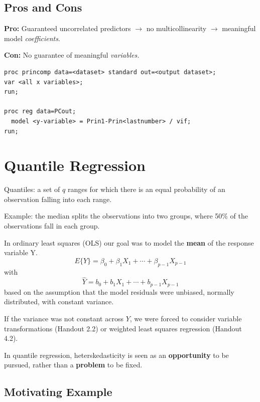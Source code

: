 \documentclass[12pt]{notes}
\begin{document}
\subsection{Pros and Cons}
\bi
\item \textbf{Pro:} Guaranteed uncorrelated predictors $\rightarrow$ no multicollinearity $\rightarrow$ meaningful model \textit{coefficients}. 
\item \textbf{Con:} No guarantee of meaningful \textit{variables.}
\ei

\begin{verbatim}
proc princomp data=<dataset> standard out=<output dataset>;
var <all x variables>;
run;

proc reg data=PCout;
  model <y-variable> = Prin1-Prin<lastnumber> / vif;
run;
\end{verbatim}

\section{Quantile Regression}
Quantiles: a set of $q$ ranges for which there is an equal probability of an observation falling into each range. 
\bi
\item Example: the median splits the observations into two groups, where 50\% of the observations fall in each group. 
\ei

In ordinary least squares (OLS) our goal was to model the \textbf{mean} of the response variable Y. 
$$E\{Y\} = \beta_0 + \beta_1X_1 + \cdots + \beta_{p-1}X_{p-1}$$
with 
$$\hat{Y} = b_0 + b_1X_1 + \cdots + b_{p-1}X_{p-1}$$
based on the assumption that the model residuals were unbiased, normally distributed, with constant variance. 

\nspace
If the variance was not constant across $Y$, we were forced to consider variable transformations (Handout 2.2) or weighted least squares regression (Handout 4.2). 

\nspace
In quantile regression, heterskedasticity is seen as an \textbf{opportunity} to be pursued, rather than a \textbf{problem} to be fixed. 

\subsection{Motivating Example}
\end{document}

